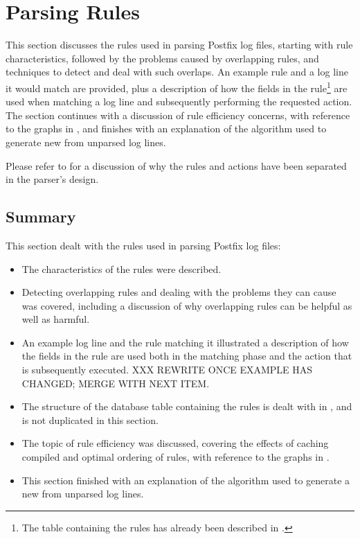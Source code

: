 \section{Parsing Rules}

\label{rules}

This section discusses the rules used in parsing Postfix log files,
starting with rule characteristics, followed by the problems caused by
overlapping rules, and techniques to detect and deal with such overlaps.
An example rule and a log line it would match are provided, plus a
description of how the fields in the rule\footnote{The table containing the
rules has already been described in .} are used
when matching a log line and subsequently performing the requested action.
The section continues with a discussion of rule efficiency concerns, with
reference to the graphs in , and finishes with an
explanation of the algorithm used to generate new \regexes{} from unparsed
log lines.

Please refer to  for a discussion of why the
rules and actions have been separated in the parser's design.

\subsection{Summary}

This section dealt with the rules used in parsing Postfix log files:

\begin{itemize}

    \item The characteristics of the rules were described.

    \item Detecting overlapping rules and dealing with the problems they
        can cause was covered, including a discussion of why overlapping
        rules can be helpful as well as harmful.

    \item An example log line and the rule matching it illustrated a
        description of how the fields in the rule are used both in the
        matching phase and the action that is subsequently executed.  XXX
        REWRITE ONCE EXAMPLE HAS CHANGED\@; MERGE WITH NEXT ITEM\@.

    \item The structure of the database table containing the rules is dealt
        with in , and is not duplicated in this
        section.

    \item The topic of rule efficiency was discussed, covering the effects
        of caching compiled \regexes{} and optimal ordering of rules, with
        reference to the graphs in .

    \item This section finished with an explanation of the algorithm used
        to generate a new \regex{} from unparsed log lines.

\end{itemize}


